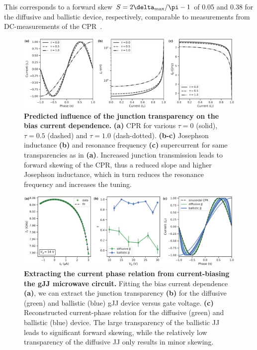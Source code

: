 This corresponds to a forward skew $S=2\delta_{\rm max}/\pi -1$ of 0.05 and 0.38 for the diffusive and ballistic device, respectively, comparable to measurements from DC-measurements of the CPR~\cite{englishObservationNonsinusoidalCurrentphase2016,nandaCurrentPhaseRelationBallistic2017}.
%
%

\begin{figure}
	\centering
	\includegraphics[width=\linewidth]{chapter-gJJ-CPR/figs/Figure5}
	\caption{
		\textbf{Predicted influence of the junction transparency on the bias current dependence.}
		\textbf{(a)} CPR for various $\tau=0$ (solid), $\tau=0.5$ (dashed) and $\tau=1.0$	(dash-dotted).
		\textbf{(b-c)} Josephson inductance \textbf{(b)} and resonance frequency \textbf{(c)} supercurrent for	same transparencies as in \textbf{(a)}.
		Increased junction transmission leads to forward skewing of the CPR, thus a reduced slope and higher Josephson inductance, which in turn reduces the resonance frequency and increases the tuning.
	}
	\label{fig:figure5}
\end{figure}

\begin{figure}
	\centering
	\includegraphics[width=\linewidth]{chapter-gJJ-CPR/figs/Figure6}
	\caption{
		\textbf{Extracting the current phase relation from current-biasing the gJJ microwave circuit.}
		Fitting the bias current dependence \textbf{(a)}, we can extract the junction transparency \textbf{(b)} for the diffusive (green) and ballistic (blue) gJJ device versus gate voltage.
		\textbf{(c)} Reconstructed current-phase relation for the diffusive (green) and ballistic (blue) device.
		The large transparency of the ballistic JJ leads to significant forward skewing, while the relatively low transparency of the diffusive JJ only results in minor skewing.
	}
	\label{fig:figure6}
\end{figure}

